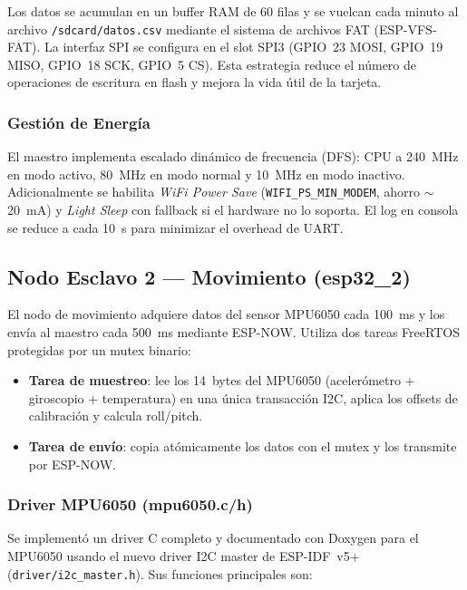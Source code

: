 \documentclass[10pt,twocolumn,a4paper]{article}
\begin{document}
Los datos se acumulan en un buffer RAM de 60 filas y se vuelcan cada
minuto al archivo \texttt{/sdcard/datos.csv} mediante el sistema de
archivos FAT (ESP-VFS-FAT). La interfaz SPI se configura en el slot
SPI3 (GPIO~23 MOSI, GPIO~19 MISO, GPIO~18 SCK, GPIO~5 CS). Esta
estrategia reduce el número de operaciones de escritura en flash y
mejora la vida útil de la tarjeta.

\subsubsection{Gestión de Energía}

El maestro implementa escalado dinámico de frecuencia (DFS):
CPU a 240~MHz en modo activo, 80~MHz en modo normal y 10~MHz en modo
inactivo. Adicionalmente se habilita \textit{WiFi Power Save}
(\texttt{WIFI\_PS\_MIN\_MODEM}, ahorro $\sim$20~mA) y \textit{Light
Sleep} con fallback si el hardware no lo soporta. El log en consola se
reduce a cada 10~s para minimizar el overhead de UART.

\subsection{Nodo Esclavo 2 — Movimiento (esp32\_2)}

El nodo de movimiento adquiere datos del sensor MPU6050 cada 100~ms y
los envía al maestro cada 500~ms mediante ESP-NOW. Utiliza dos tareas
FreeRTOS protegidas por un mutex binario:

\begin{itemize}
  \item \textbf{Tarea de muestreo}: lee los 14~bytes del MPU6050
        (acelerómetro + giroscopio + temperatura) en una única
        transacción I2C, aplica los offsets de calibración y calcula
        roll/pitch.
  \item \textbf{Tarea de envío}: copia atómicamente los datos con el
        mutex y los transmite por ESP-NOW.
\end{itemize}

\subsubsection{Driver MPU6050 (mpu6050.c/h)}

Se implementó un driver C completo y documentado con Doxygen para el
MPU6050 usando el nuevo driver I2C master de ESP-IDF~v5+
(\texttt{driver/i2c\_master.h}). Sus funciones principales son:
\end{document}
